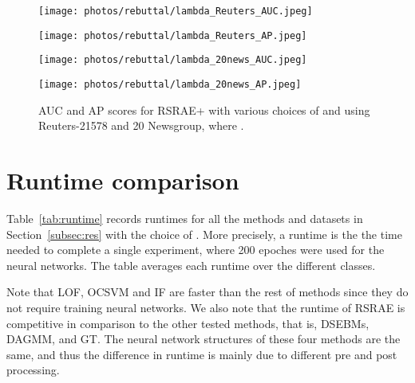 \documentclass{article} \usepackage{iclr2020_conference,times}
\def\Secref#1{Section~\ref{#1}}
\begin{document}
\begin{figure}

 
\centering
\begin{minipage}[t]{0.48\textwidth}
\centering
\texttt{[image: photos/rebuttal/lambda\_Reuters\_AUC.jpeg]}
\end{minipage}
\begin{minipage}[t]{0.48\textwidth}
\centering
\texttt{[image: photos/rebuttal/lambda\_Reuters\_AP.jpeg]}
\end{minipage}


\centering
\begin{minipage}[t]{0.48\textwidth}
\centering
\texttt{[image: photos/rebuttal/lambda\_20news\_AUC.jpeg]}
\end{minipage}
\begin{minipage}[t]{0.48\textwidth}
\centering
\texttt{[image: photos/rebuttal/lambda\_20news\_AP.jpeg]}
\end{minipage}

\caption{AUC and AP scores for RSRAE+ with various choices of  and  using Reuters-21578 and 20 Newsgroup, where .
}
\label{fig:hyperparameters2}
\end{figure}

\newpage
\section{Runtime comparison}
\label{sec:runtime}
Table~\ref{tab:runtime} records runtimes for all the methods and datasets in \Secref{subsec:res} with the choice of . More precisely, a runtime is the the time needed to complete a single experiment, where 200 epoches were used for the neural networks. The table averages each runtime over the different classes.



Note that LOF, OCSVM and IF are faster than the rest of methods since they do not require training neural networks. 
We also note that the runtime of RSRAE is competitive in comparison to the other tested methods, that is, 
DSEBMs, DAGMM, and GT. The neural network structures of these four methods are the same, and thus the difference in runtime is mainly due to different pre and post processing. 
\end{document}
